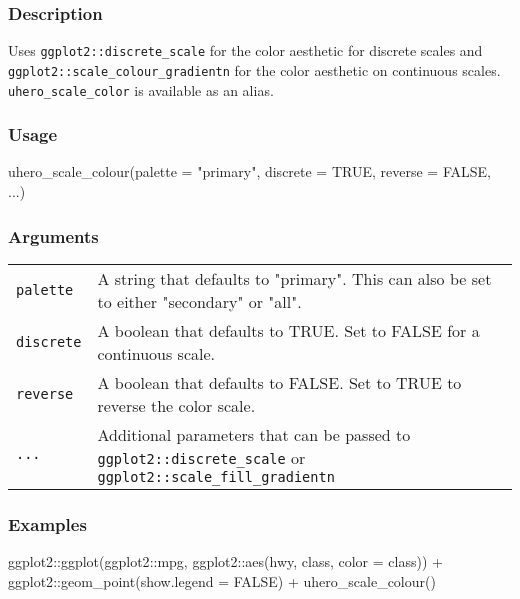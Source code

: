 \documentclass[
  letterpaper,
  DIV=11,
  numbers=noendperiod]{scrreport}
\newenvironment{Shaded}{\begin{snugshade}}{\end{snugshade}}
\newcommand{\AttributeTok}[1]{\textcolor[rgb]{0.40,0.45,0.13}{#1}}
\newcommand{\ConstantTok}[1]{\textcolor[rgb]{0.56,0.35,0.01}{#1}}
\newcommand{\FunctionTok}[1]{\textcolor[rgb]{0.28,0.35,0.67}{#1}}
\newcommand{\NormalTok}[1]{\textcolor[rgb]{0.00,0.23,0.31}{#1}}
\newcommand{\SpecialCharTok}[1]{\textcolor[rgb]{0.37,0.37,0.37}{#1}}
\newcommand{\StringTok}[1]{\textcolor[rgb]{0.13,0.47,0.30}{#1}}
\begin{document}
\subsubsection{Description}\label{description-73}

Uses \texttt{ggplot2::discrete\_scale} for the color aesthetic for
discrete scales and \texttt{ggplot2::scale\_colour\_gradientn} for the
color aesthetic on continuous scales. \texttt{uhero\_scale\_color} is
available as an alias.

\subsubsection{Usage}\label{usage-73}

\begin{Shaded}
\begin{Highlighting}[]
\FunctionTok{uhero\_scale\_colour}\NormalTok{(}\AttributeTok{palette =} \StringTok{"primary"}\NormalTok{, }\AttributeTok{discrete =} \ConstantTok{TRUE}\NormalTok{, }\AttributeTok{reverse =} \ConstantTok{FALSE}\NormalTok{, ...)}
\end{Highlighting}
\end{Shaded}

\subsubsection{Arguments}\label{arguments-73}

\begin{longtable}[]{@{}ll@{}}
\toprule\noalign{}
\endhead
\bottomrule\noalign{}
\endlastfoot
\texttt{palette} & A string that defaults to "primary". This can also be
set to either "secondary" or "all". \\
\texttt{discrete} & A boolean that defaults to TRUE. Set to FALSE for a
continuous scale. \\
\texttt{reverse} & A boolean that defaults to FALSE. Set to TRUE to
reverse the color scale. \\
\texttt{...} & Additional parameters that can be passed to
\texttt{ggplot2::discrete\_scale} or
\texttt{ggplot2::scale\_fill\_gradientn} \\
\end{longtable}

\subsubsection{Examples}\label{examples-73}

\begin{Shaded}
\begin{Highlighting}[]
\NormalTok{ggplot2}\SpecialCharTok{::}\FunctionTok{ggplot}\NormalTok{(ggplot2}\SpecialCharTok{::}\NormalTok{mpg, ggplot2}\SpecialCharTok{::}\FunctionTok{aes}\NormalTok{(hwy, class, }\AttributeTok{color =}\NormalTok{ class)) }\SpecialCharTok{+}
\NormalTok{ggplot2}\SpecialCharTok{::}\FunctionTok{geom\_point}\NormalTok{(}\AttributeTok{show.legend =} \ConstantTok{FALSE}\NormalTok{) }\SpecialCharTok{+}
\FunctionTok{uhero\_scale\_colour}\NormalTok{()}
\end{Highlighting}
\end{Shaded}
\end{document}
